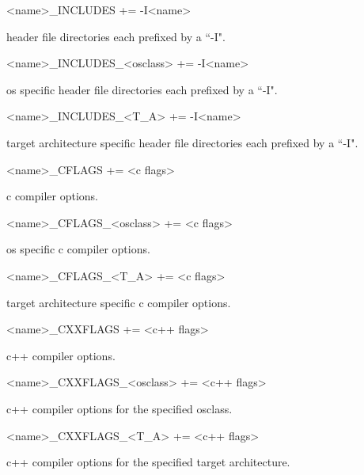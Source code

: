 \begin{description}

\item \textless{}name\textgreater{}\_INCLUDES += -I\textless{}name\textgreater{}

header file directories each prefixed by a ``-I".

\item \textless{}name\textgreater{}\_INCLUDES\_\textless{}osclass\textgreater{} += -I\textless{}name\textgreater{}

os specific header file directories each prefixed by a ``-I".

\item \textless{}name\textgreater{}\_INCLUDES\_\textless{}T\_A\textgreater{} += -I\textless{}name\textgreater{}

target architecture specific header file directories each prefixed by a ``-I".

\item \textless{}name\textgreater{}\_CFLAGS += \textless{}c flags\textgreater{}

c compiler options.

\item \textless{}name\textgreater{}\_CFLAGS\_\textless{}osclass\textgreater{} += \textless{}c flags\textgreater{}

os specific c compiler options.

\item \textless{}name\textgreater{}\_CFLAGS\_\textless{}T\_A\textgreater{} += \textless{}c flags\textgreater{}

target architecture specific c compiler options.

\item \textless{}name\textgreater{}\_CXXFLAGS += \textless{}c++ flags\textgreater{}

c++ compiler options.

\item \textless{}name\textgreater{}\_CXXFLAGS\_\textless{}osclass\textgreater{} += \textless{}c++ flags\textgreater{}

c++ compiler options for the specified osclass.

\item \textless{}name\textgreater{}\_CXXFLAGS\_\textless{}T\_A\textgreater{} += \textless{}c++ flags\textgreater{}

c++ compiler options for the specified target architecture.


\end{description}
